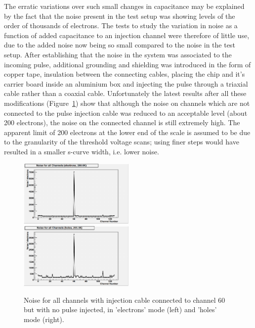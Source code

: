 The erratic variations over such small changes in capacitance may be explained by the fact that the noise
present in the test setup was showing levels of the order of thousands of electrons. The tests to study
the variation in noise as a function of added capacitance to an injection channel were therefore of little
use, due to the added noise now being so small compared to the noise in the test setup. After establishing
that the noise in the system was associated to the incoming pulse, additional grounding and shielding was
introduced in the form of copper tape, insulation between the connecting cables, placing the chip and it’s
carrier board inside an aluminium box and injecting the pulse through a triaxial cable rather than a coaxial
cable. Unfortunately the latest results after all these modifications (Figure~\ref{fig:noise_all_channels})
show that although the noise on channels which are not connected to the pulse injection cable was reduced
to an acceptable level (about 200 electrons), the noise on the connected channel is still extremely high.
The apparent limit of 200 electrons at the lower end of the scale is assumed to be due to the granularity of
the threshold voltage scans; using finer steps would have resulted in a smaller s-curve width, i.e. lower
noise.

\begin{figure}[hbtp]
   \centering
     \includegraphics[width=0.5\textwidth]{Chapters/07_Appendices/07c_2_Images/noise_all_channels_60_connected_no_pulse_electrons}\hfill
     \includegraphics[width=0.5\textwidth]{Chapters/07_Appendices/07c_2_Images/noise_all_channels_60_connected_no_pulse_holes}
     \caption{Noise for all channels with injection cable connected to channel 60 but with no pulse injected,
     in 'electrons' mode (left) and 'holes' mode (right).}
     \label{fig:noise_all_channels}
\end{figure}


